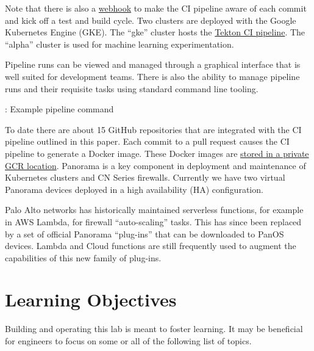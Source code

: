 \justifying
Note that there is also a \href{https://docs.github.com/en/developers/webhooks-and-events/webhooks/about-webhooks}{webhook} to make the CI pipeline
aware of each commit and kick off a test and build cycle.
\vspace{2mm}
\justifying
{}
\vspace{2mm}
\justifying
Two clusters are deployed with the Google Kubernetes Engine (GKE). The ``gke'' cluster hosts the \href{https://tekton.dev/}{Tekton CI pipeline}.
The ``alpha'' cluster is used for machine learning experimentation.


\justifying
Pipeline runs can be viewed and managed through a graphical interface that is well suited for development teams. There is
also the ability to manage pipeline runs and their requisite tasks using standard command line tooling.

\begin{mybox}{\thetcbcounter: Example pipeline command}
	
\end{mybox}
\vspace{2mm}
\vspace{2mm}
\justifying
To date there are about 15 GitHub repositories that are integrated with the CI pipeline outlined in this paper. Each commit
to a pull request causes the CI pipeline to generate a Docker image. These Docker images 
are \href{https://cloud.google.com/container-registry/}{stored in a private GCR location}.
\vspace{2mm}
\vspace{2mm}
\justifying
Panorama is a key component in deployment and maintenance of Kubernetes clusters and CN Series firewalls. Currently we have
two virtual Panorama devices deployed in a high availability (HA) configuration.

\justifying
Palo Alto networks has historically maintained serverless functions, for example in AWS Lambda, for firewall ``auto-scaling'' tasks. This has since been
replaced by a set of official Panorama ``plug-ins'' that can be downloaded to PanOS devices. Lambda and Cloud functions
are still frequently used to augment the capabilities of this new family of plug-ins.
\vspace{2mm}
\section{\label{sec:LO}Learning Objectives}
\vspace{2mm}
Building and operating this lab is meant to foster learning. It may be beneficial for engineers to focus on some or all of the
following list of topics.

